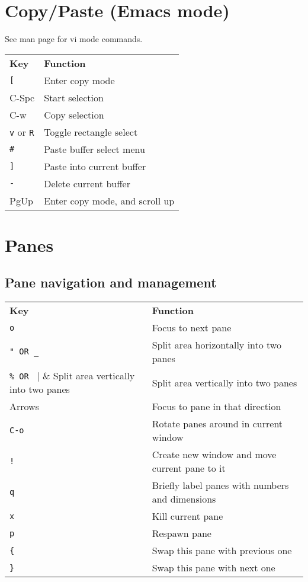 \documentclass[landscape]{article}
\newcommand{\thead}[1]{{\color{black}\bf#1}}
\newcommand{\blankfirst}{%
  \ifodd\rownum\advance\rownum1\relax\fi}
\begin{document}
\begin{multicols}{3}
  \section*{Copy/Paste (Emacs mode)}
  See man page for vi mode commands.\\
  \blankfirst
  \noindent\begin{tabular}{p{0.6in}p{2.3in}} %
    \thead{Key} & \thead{Function}\\
    \verb|[| & Enter copy mode\\
    C-Spc & Start selection\\
    C-w & Copy selection\\
    \verb|v| or \verb|R| & Toggle rectangle select\\
    \verb|#| & Paste buffer select menu\\
    \verb|]| & Paste into current buffer\\
    \verb|-| & Delete current buffer\\
    PgUp &  Enter copy mode, and scroll up\\
  \end{tabular}

  \section*{Panes}
  \subsection*{\color{gray!80}Pane navigation and management}
  \blankfirst
  \noindent\begin{tabular}{p{0.6in}p{2.3in}} %
    \thead{Key} & \thead{Function}\\
    \verb|o| & Focus to next pane\\
    \verb|" OR _ | & Split area horizontally into two panes\\
    \verb|% OR | | & Split area vertically into two panes\\
    Arrows & Focus to pane in that direction\\
    \verb|C-o| & Rotate panes around in current window\\
    \verb|!| & Create new window and move current pane to it\\
    \verb|q| & Briefly label panes with numbers and dimensions\\
    \verb|x| & Kill current pane\\
    \verb|p| & Respawn pane\\
    \verb|{| & Swap this pane with previous one\\
      \verb|}| & Swap this pane with next one\\
  \end{tabular}

\end{multicols}
\end{document}
